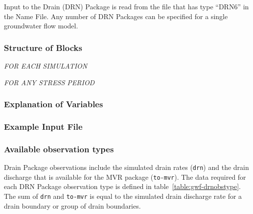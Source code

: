 Input to the Drain (DRN) Package is read from the file that has type ``DRN6'' in the Name File.  Any number of DRN Packages can be specified for a single groundwater flow model.

\vspace{5mm}
\subsubsection{Structure of Blocks}
\vspace{5mm}

\noindent \textit{FOR EACH SIMULATION}


\vspace{5mm}
\noindent \textit{FOR ANY STRESS PERIOD}

\packageperioddescription

\vspace{5mm}
\subsubsection{Explanation of Variables}
\begin{description}

\end{description}

\vspace{5mm}
\subsubsection{Example Input File}


\vspace{5mm}
\subsubsection{Available observation types}
Drain Package observations include the simulated drain rates (\texttt{drn}) and the drain discharge that is available for the MVR package (\texttt{to-mvr}). The data required for each DRN Package observation type is defined in table~\ref{table:gwf-drnobstype}. The sum of \texttt{drn} and \texttt{to-mvr} is equal to the simulated drain discharge rate for a drain boundary or group of drain boundaries.

